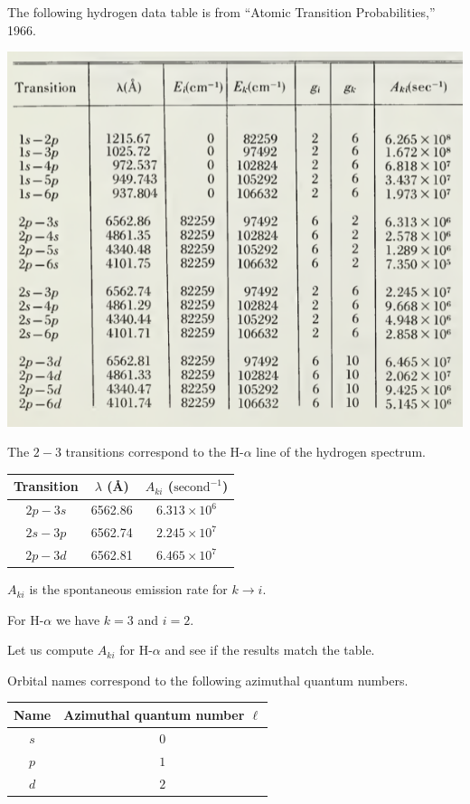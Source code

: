 \documentclass[12pt]{article}
\begin{document}
\noindent
The following hydrogen data table is from ``Atomic Transition Probabilities,'' 1966.

\begin{center}
\includegraphics[scale=0.5]{h-alpha-line.png}
\end{center}

\noindent
The $2-3$ transitions correspond to the H-$\alpha$ line of the hydrogen spectrum.
\begin{center}
\begin{tabular}{|c|c|c|}
\hline
Transition & $\lambda$ (\AA) & $A_{ki}$ ($\text{second}^{-1}$)
\\
\hline
$2p-3s$ & 6562.86 & $6.313\times10^6$
\\
$2s-3p$ & 6562.74 & $2.245\times10^7$
\\
$2p-3d$ & 6562.81 & $6.465\times10^7$
\\
\hline
\end{tabular}
\end{center}

\noindent
$A_{ki}$ is the spontaneous emission rate for $k\rightarrow i$.

\bigskip
\noindent
For H-$\alpha$ we have $k=3$ and $i=2$.

\bigskip
\noindent
Let us compute $A_{ki}$ for H-$\alpha$ and see if the results match the table.

\bigskip
\noindent
Orbital names correspond to the following azimuthal quantum numbers.
\begin{center}
\begin{tabular}{|c|c|}
\hline
Name & Azimuthal quantum number $\ell$
\\
\hline
$s$ & $0$
\\
$p$ & $1$
\\
$d$ & $2$
\\
\hline
\end{tabular}
\end{center}
\end{document}
